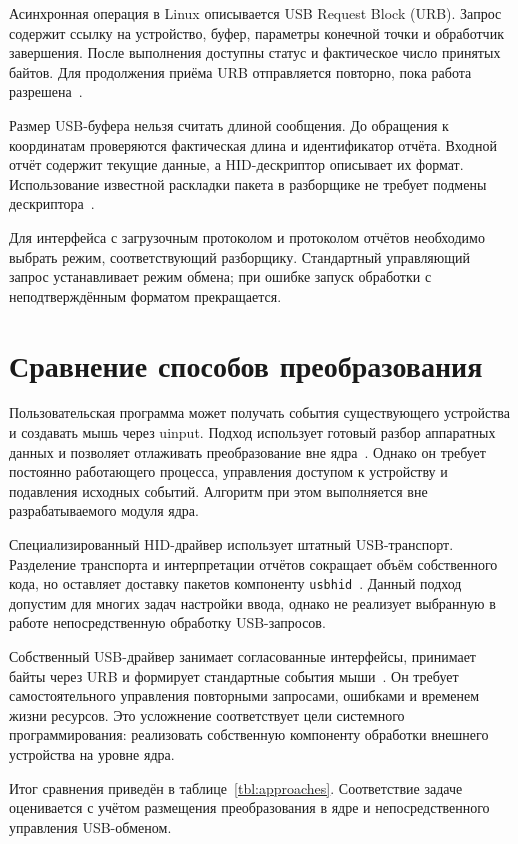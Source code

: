Асинхронная операция в Linux описывается USB Request Block (URB). Запрос содержит ссылку на устройство, буфер, параметры конечной точки и обработчик завершения. После выполнения доступны статус и фактическое число принятых байтов. Для продолжения приёма URB отправляется повторно, пока работа разрешена~\cite{kernelurb}.

Размер USB-буфера нельзя считать длиной сообщения. До обращения к координатам проверяются фактическая длина и идентификатор отчёта. Входной отчёт содержит текущие данные, а HID-дескриптор описывает их формат. Использование известной раскладки пакета в разборщике не требует подмены дескриптора~\cite{usb_hid}.

Для интерфейса с загрузочным протоколом и протоколом отчётов необходимо выбрать режим, соответствующий разборщику. Стандартный управляющий запрос устанавливает режим обмена; при ошибке запуск обработки с неподтверждённым форматом прекращается.

\section{Сравнение способов преобразования}

Пользовательская программа может получать события существующего устройства и создавать мышь через uinput. Подход использует готовый разбор аппаратных данных и позволяет отлаживать преобразование вне ядра~\cite{uinput}. Однако он требует постоянно работающего процесса, управления доступом к устройству и подавления исходных событий. Алгоритм при этом выполняется вне разрабатываемого модуля ядра.

Специализированный HID-драйвер использует штатный USB-транспорт. Разделение транспорта и интерпретации отчётов сокращает объём собственного кода, но оставляет доставку пакетов компоненту \texttt{usbhid}~\cite{hidtransport}. Данный подход допустим для многих задач настройки ввода, однако не реализует выбранную в работе непосредственную обработку USB-запросов.

Собственный USB-драйвер занимает согласованные интерфейсы, принимает байты через URB и формирует стандартные события мыши~\cite{kernelusb}. Он требует самостоятельного управления повторными запросами, ошибками и временем жизни ресурсов. Это усложнение соответствует цели системного программирования: реализовать собственную компоненту обработки внешнего устройства на уровне ядра.

Итог сравнения приведён в таблице~\ref{tbl:approaches}. Соответствие задаче оценивается с учётом размещения преобразования в ядре и непосредственного управления USB-обменом.


